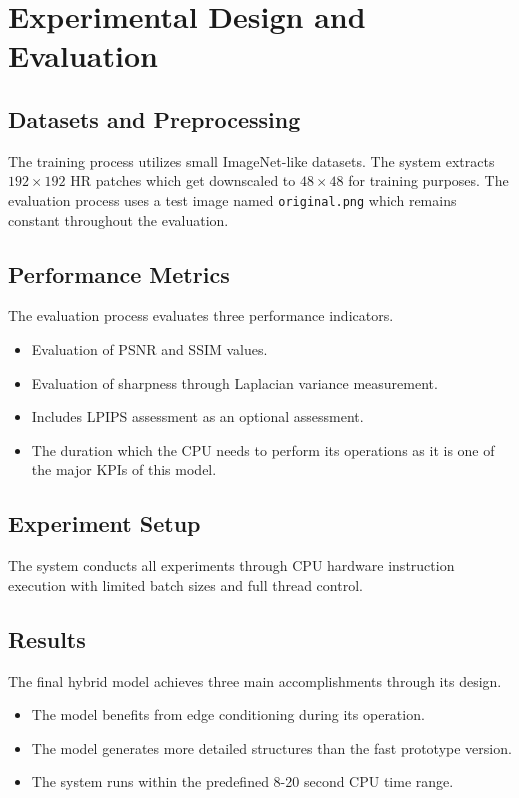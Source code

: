 \documentclass[conference]{IEEEtran}
\begin{document}
\section{Experimental Design and Evaluation}

\subsection{Datasets and Preprocessing}
The training process utilizes small ImageNet-like datasets. The system extracts $192\times192$ HR patches which get downscaled to $48\times48$ for training purposes. The evaluation process uses a test image named \texttt{original.png} which remains constant throughout the evaluation.

\subsection{Performance Metrics}
The evaluation process evaluates three performance indicators.

\begin{itemize}
    \item Evaluation of PSNR and SSIM values.
    \item Evaluation of sharpness through Laplacian variance measurement.
    \item Includes LPIPS assessment as an optional assessment.
    \item The duration which the CPU needs to perform its operations as it is one of the major KPIs of this model.
\end{itemize}

\subsection{Experiment Setup}
The system conducts all experiments through CPU hardware instruction execution with limited batch sizes and full thread control.

\subsection{Results}
The final hybrid model achieves three main accomplishments through its design.

\begin{itemize}
    \item The model benefits from edge conditioning during its operation.
    \item The model generates more detailed structures than the fast prototype version.
    \item The system runs within the predefined 8-20 second CPU time range.
\end{itemize}
\end{document}
